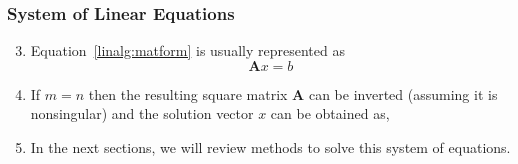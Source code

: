 \documentclass[10pt,compress,handout,ignorenonframetext]{beamer}
\begin{document}
\begin{frame}
  \frametitle{System of Linear Equations} 
  \begin{enumerate}
  \setcounter{enumi}{2}
    \item <1-> Equation~\ref{linalg:matform} is usually represented as 
        \begin{equation}
          \bm{A} x = b\label{linalg:linalg}
         \end{equation}
    \item <2-> If $m=n$ then the resulting square matrix $\bm{A}$ can be inverted (assuming it is nonsingular) and the solution vector $x$ can be obtained as,
    \item <4-> In the next sections, we will review methods to solve this system of equations.
  \end{enumerate}
\end{frame}
\end{document}
